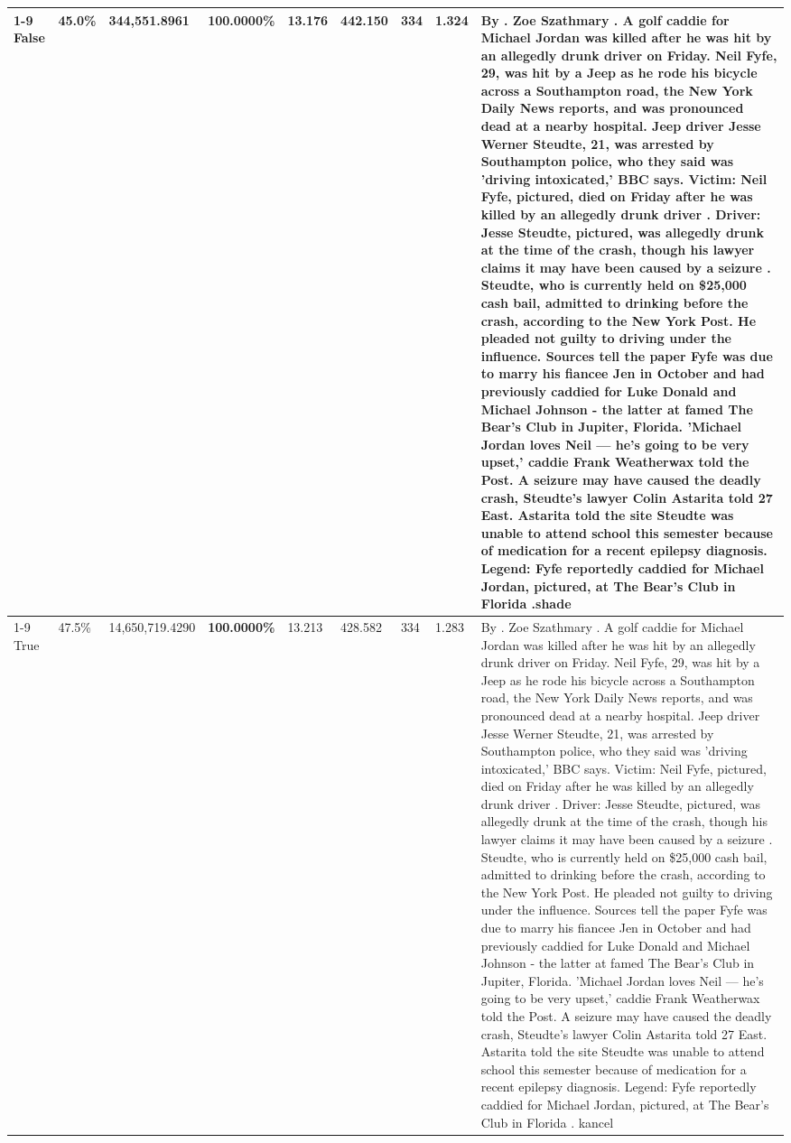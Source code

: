 \begin{table}[H]
\begin{tabular}{lllrlllll}
\cline{1-9}
False & 45.0\% & 344,551.8961 & \bfseries \color{red} 100.0000\% & 13.176 & 442.150 & 334 & 1.324 & By . Zoe Szathmary . A golf caddie for Michael Jordan was killed after he was hit by an allegedly drunk driver on Friday. Neil Fyfe, 29, was hit by a Jeep as he rode his bicycle across a Southampton road, the New York Daily News reports, and was pronounced dead at a nearby hospital. Jeep driver Jesse Werner Steudte, 21, was arrested by Southampton police, who they said was 'driving intoxicated,' BBC says. Victim: Neil Fyfe, pictured, died on Friday after he was killed by an allegedly drunk driver . Driver: Jesse Steudte, pictured, was allegedly drunk at the time of the crash, though his lawyer claims it may have been caused by a seizure . Steudte, who is currently held on \$25,000 cash bail, admitted to drinking before the crash, according to the New York Post. He pleaded not guilty to driving under the influence. Sources tell the paper Fyfe was due to marry his fiancee Jen in October and had previously caddied for Luke Donald and Michael Johnson - the latter at famed The Bear's Club in Jupiter, Florida. 'Michael Jordan loves Neil — he’s going to be very upset,' caddie Frank Weatherwax told the Post. A seizure may have caused the deadly crash, Steudte's lawyer Colin Astarita told 27 East. Astarita told the site Steudte was unable to attend school this semester because of medication for a recent epilepsy diagnosis. Legend: Fyfe reportedly caddied for Michael Jordan, pictured, at The Bear's Club in Florida .shade \\
\cline{1-9}
True & 47.5\% & 14,650,719.4290 & \bfseries \color{red} 100.0000\% & 13.213 & 428.582 & 334 & 1.283 & By . Zoe Szathmary . A golf caddie for Michael Jordan was killed after he was hit by an allegedly drunk driver on Friday. Neil Fyfe, 29, was hit by a Jeep as he rode his bicycle across a Southampton road, the New York Daily News reports, and was pronounced dead at a nearby hospital. Jeep driver Jesse Werner Steudte, 21, was arrested by Southampton police, who they said was 'driving intoxicated,' BBC says. Victim: Neil Fyfe, pictured, died on Friday after he was killed by an allegedly drunk driver . Driver: Jesse Steudte, pictured, was allegedly drunk at the time of the crash, though his lawyer claims it may have been caused by a seizure . Steudte, who is currently held on \$25,000 cash bail, admitted to drinking before the crash, according to the New York Post. He pleaded not guilty to driving under the influence. Sources tell the paper Fyfe was due to marry his fiancee Jen in October and had previously caddied for Luke Donald and Michael Johnson - the latter at famed The Bear's Club in Jupiter, Florida. 'Michael Jordan loves Neil — he’s going to be very upset,' caddie Frank Weatherwax told the Post. A seizure may have caused the deadly crash, Steudte's lawyer Colin Astarita told 27 East. Astarita told the site Steudte was unable to attend school this semester because of medication for a recent epilepsy diagnosis. Legend: Fyfe reportedly caddied for Michael Jordan, pictured, at The Bear's Club in Florida . kancel \\

\end{tabular}
\end{table}
